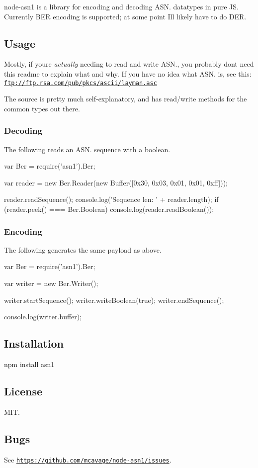 node-\/asn1 is a library for encoding and decoding A\+S\+N. datatypes in pure JS. Currently B\+ER encoding is supported; at some point I\textquotesingle{}ll likely have to do D\+ER.

\subsection*{Usage}

Mostly, if you\textquotesingle{}re {\itshape actually} needing to read and write A\+S\+N., you probably don\textquotesingle{}t need this readme to explain what and why. If you have no idea what A\+S\+N. is, see this\+: \href{ftp://ftp.rsa.com/pub/pkcs/ascii/layman.asc}{\tt ftp\+://ftp.\+rsa.\+com/pub/pkcs/ascii/layman.\+asc}

The source is pretty much self-\/explanatory, and has read/write methods for the common types out there.

\subsubsection*{Decoding}

The following reads an A\+S\+N. sequence with a boolean. \begin{DoxyVerb}var Ber = require('asn1').Ber;

var reader = new Ber.Reader(new Buffer([0x30, 0x03, 0x01, 0x01, 0xff]));

reader.readSequence();
console.log('Sequence len: ' + reader.length);
if (reader.peek() === Ber.Boolean)
  console.log(reader.readBoolean());
\end{DoxyVerb}


\subsubsection*{Encoding}

The following generates the same payload as above. \begin{DoxyVerb}var Ber = require('asn1').Ber;

var writer = new Ber.Writer();

writer.startSequence();
writer.writeBoolean(true);
writer.endSequence();

console.log(writer.buffer);
\end{DoxyVerb}


\subsection*{Installation}

\begin{DoxyVerb}npm install asn1
\end{DoxyVerb}


\subsection*{License}

M\+IT.

\subsection*{Bugs}

See \href{https://github.com/mcavage/node-asn1/issues}{\tt https\+://github.\+com/mcavage/node-\/asn1/issues}. 
